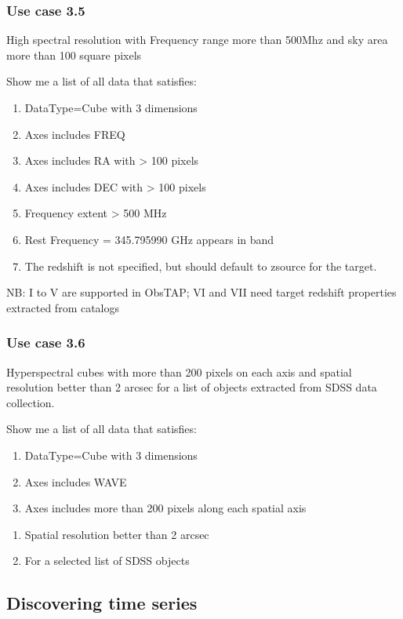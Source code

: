 \documentclass[11pt,a4paper]{ivoa}
\begin{document}
\subsubsection{Use case 3.5}
High spectral resolution with Frequency range more than 500Mhz and sky area more than 100 square pixels

Show me a list of all data that satisfies:

\begin{enumerate}
\item DataType=Cube with 3 dimensions
\item Axes includes FREQ
\item Axes includes RA with {\textgreater} 100 pixels
\item Axes includes DEC with {\textgreater} 100 pixels
\item Frequency extent {\textgreater} 500 MHz
\item Rest Frequency = 345.795990 GHz appears in band
\item The redshift is not specified, but should default to zsource for the target.
\end{enumerate}
NB: I to V are supported in ObsTAP; VI and VII need target redshift properties extracted from catalogs

\subsubsection{Use case 3.6}
Hyperspectral cubes with more than 200 pixels on each axis and spatial resolution better than 2 arcsec for a list of
objects extracted from SDSS data collection.

Show me a list of all data that satisfies:

\begin{enumerate}
\item DataType=Cube with 3 dimensions
\item Axes includes WAVE
\item Axes includes more than 200 pixels along each spatial axis
\end{enumerate}
\begin{enumerate}
\item Spatial resolution better than 2 arcsec
\item For  a selected list of SDSS objects
\end{enumerate}

\subsection[Discovering time series]{Discovering time series}
\end{document}
